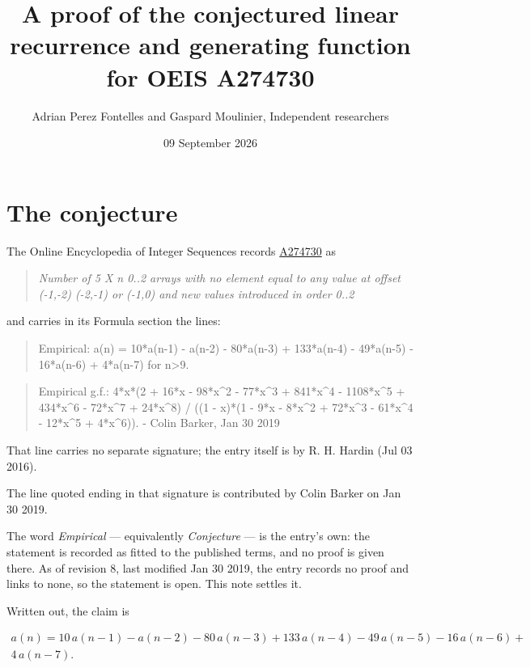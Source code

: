 \documentclass[11pt]{article}
\title{A proof of the conjectured linear recurrence and generating function for OEIS A274730}
\author{Adrian Perez Fontelles and Gaspard Moulinier, Independent researchers}
\date{09 September 2026}
\theoremstyle{definition}
\begin{document}
\maketitle
\section{The conjecture}

The Online Encyclopedia of Integer Sequences records \href{https://oeis.org/A274730}{A274730} as

\begin{quote}\itshape Number of 5 X n 0..2 arrays with no element equal to any value at offset (-1,-2) (-2,-1) or (-1,0) and new values introduced in order 0..2\end{quote}

and carries in its Formula section the lines:

\begin{quote}\ttfamily Empirical: a(n) = 10*a(n-1) - a(n-2) - 80*a(n-3) + 133*a(n-4) - 49*a(n-5) - 16*a(n-6) + 4*a(n-7) for n>9.\end{quote}

\begin{quote}\ttfamily Empirical g.f.: 4*x*(2 + 16*x - 98*x\textasciicircum{}2 - 77*x\textasciicircum{}3 + 841*x\textasciicircum{}4 - 1108*x\textasciicircum{}5 + 434*x\textasciicircum{}6 - 72*x\textasciicircum{}7 + 24*x\textasciicircum{}8) / ((1 - x)*(1 - 9*x - 8*x\textasciicircum{}2 + 72*x\textasciicircum{}3 - 61*x\textasciicircum{}4 - 12*x\textasciicircum{}5 + 4*x\textasciicircum{}6)). - Colin Barker, Jan 30 2019\end{quote}

That line carries no separate signature; the entry itself is by R. H. Hardin (Jul 03 2016).

The line quoted ending in that signature is contributed by Colin Barker on Jan 30 2019.

The word {\itshape Empirical} --- equivalently {\itshape Conjecture} --- is the entry's own: the statement is recorded as fitted to the published terms, and no proof is given there. As of revision 8, last modified Jan 30 2019, the entry records no proof and links to none, so the statement is open. This note settles it.

Written out, the claim is

\begin{multline*} a(n) = 10\,a(n-1) - a(n-2) - 80\,a(n-3) + 133\,a(n-4) - 49\,a(n-5) - 16\,a(n-6) + \\ 4\,a(n-7). \end{multline*}
\end{document}
